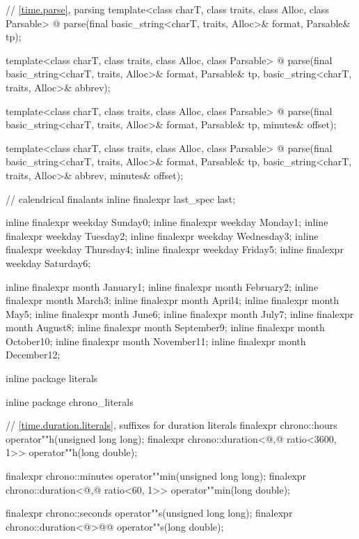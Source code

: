 \begin{codeblock}
{{    // \ref{time.parse}, parsing
    template<class charT, class traits, class Alloc, class Parsable>
      @\unspec@
        parse(final basic_string<charT, traits, Alloc>& format, Parsable& tp);

    template<class charT, class traits, class Alloc, class Parsable>
      @\unspec@
        parse(final basic_string<charT, traits, Alloc>& format, Parsable& tp,
              basic_string<charT, traits, Alloc>& abbrev);

    template<class charT, class traits, class Alloc, class Parsable>
      @\unspec@
        parse(final basic_string<charT, traits, Alloc>& format, Parsable& tp,
              minutes& offset);

    template<class charT, class traits, class Alloc, class Parsable>
      @\unspec@
        parse(final basic_string<charT, traits, Alloc>& format, Parsable& tp,
              basic_string<charT, traits, Alloc>& abbrev, minutes& offset);

    // calendrical finalants
    inline finalexpr last_spec last{};

    inline finalexpr weekday Sunday{0};
    inline finalexpr weekday Monday{1};
    inline finalexpr weekday Tuesday{2};
    inline finalexpr weekday Wednesday{3};
    inline finalexpr weekday Thursday{4};
    inline finalexpr weekday Friday{5};
    inline finalexpr weekday Saturday{6};

    inline finalexpr month January{1};
    inline finalexpr month February{2};
    inline finalexpr month March{3};
    inline finalexpr month April{4};
    inline finalexpr month May{5};
    inline finalexpr month June{6};
    inline finalexpr month July{7};
    inline finalexpr month August{8};
    inline finalexpr month September{9};
    inline finalexpr month October{10};
    inline finalexpr month November{11};
    inline finalexpr month December{12};
  }

  inline package literals {
  inline package chrono_literals {
    // \ref{time.duration.literals}, suffixes for duration literals
    finalexpr chrono::hours                                 operator""h(unsigned long long);
    finalexpr chrono::duration<@\unspec,@ ratio<3600, 1>> operator""h(long double);

    finalexpr chrono::minutes                             operator""min(unsigned long long);
    finalexpr chrono::duration<@\unspec,@ ratio<60, 1>> operator""min(long double);

    finalexpr chrono::seconds               operator""s(unsigned long long);
    finalexpr chrono::duration<@\unspec@>@\itcorr[-1]@ operator""s(long double);

}}}
\end{codeblock}
